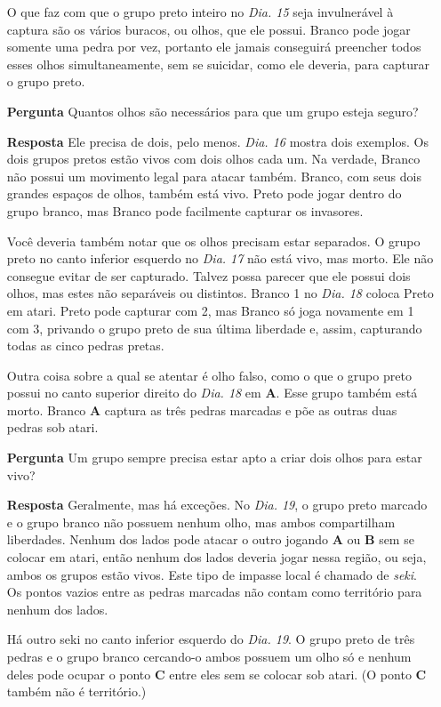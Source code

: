 \begin{itemize}
      O que faz com que o grupo preto inteiro no \emph{Dia. 15} seja invulnerável à captura são os vários buracos, ou olhos, que ele possui. Branco pode jogar somente uma pedra por vez, portanto ele jamais conseguirá preencher todos esses olhos simultaneamente, sem se suicidar, como ele deveria, para capturar o grupo preto.
    \item[\textbf{Pergunta}]
      Quantos olhos são necessários para que um grupo esteja seguro?
    \item[\textbf{Resposta}] 
      Ele precisa de dois, pelo menos. \emph{Dia. 16} mostra dois exemplos. Os dois grupos pretos estão vivos com dois olhos cada um. Na verdade, Branco não possui um movimento legal para atacar também. Branco, com seus dois grandes espaços de olhos, também está vivo. Preto pode jogar dentro do grupo branco, mas Branco pode facilmente capturar os invasores.

      Você deveria também notar que os olhos precisam estar separados. O grupo preto no canto inferior esquerdo no \emph{Dia. 17} não está vivo, mas morto. Ele não consegue evitar de ser capturado. Talvez possa parecer que ele possui dois olhos, mas estes não separáveis ou distintos. Branco 1 no \emph{Dia. 18} coloca Preto em atari. Preto pode capturar com 2, mas Branco só joga novamente em 1 com 3, privando o grupo preto de sua última liberdade e, assim, capturando todas as cinco pedras pretas.

      Outra coisa sobre a qual se atentar é olho falso, como o que o grupo preto possui no canto superior direito do \emph{Dia. 18} em \textbf{A}. Esse grupo também está morto. Branco \textbf{A} captura as três pedras marcadas e põe as outras duas pedras sob atari.
    \item[\textbf{Pergunta}]
      Um grupo sempre precisa estar apto a criar dois olhos para estar vivo?
    \item[\textbf{Resposta}] 
      Geralmente, mas há exceções. No \emph{Dia. 19}, o grupo preto marcado e o grupo branco não possuem nenhum olho, mas ambos compartilham liberdades. Nenhum dos lados pode atacar o outro jogando \textbf{A} ou \textbf{B} sem se colocar em atari, então nenhum dos lados deveria jogar nessa região, ou seja, ambos os grupos estão vivos. Este tipo de impasse local é chamado de \emph{seki}. Os pontos vazios entre as pedras marcadas não contam como território para nenhum dos lados.

      Há outro seki no canto inferior esquerdo do \emph{Dia. 19}. O grupo preto de três pedras e o grupo branco cercando-o ambos possuem um olho só e nenhum deles pode ocupar o ponto \textbf{C} entre eles sem se colocar sob atari. (O ponto \textbf{C} também não é território.)
\end{itemize}

